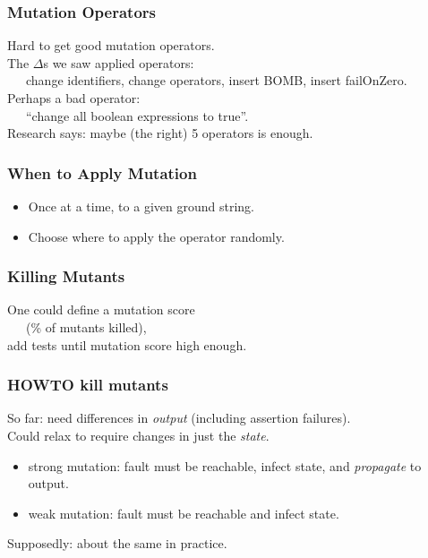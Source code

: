 \documentclass{beamer}
\newenvironment{changemargin}[1]{%
  \begin{list}{}{%
    \setlength{\topsep}{0pt}%
    \setlength{\leftmargin}{#1}%
    \setlength{\rightmargin}{1em}
    \setlength{\listparindent}{\parindent}%
    \setlength{\itemindent}{\parindent}%
    \setlength{\parsep}{\parskip}%
  }%
  \item[]}{\end{list}}
\begin{document}
\begin{frame}
  \frametitle{Mutation Operators}

  \large
  \begin{changemargin}{2em}
    Hard to get good mutation operators.\\[1em]
    The $\Delta$s we saw applied operators: \\
    ~~~change identifiers, change operators, insert BOMB, insert failOnZero.\\[1em]
    Perhaps a bad operator: \\
    ~~~``change all boolean expressions to {\sf true}''.\\[1em]
    Research says: maybe (the right) 5 operators is enough.
    
  \end{changemargin}
\end{frame}

\begin{frame}
  \frametitle{When to Apply Mutation}

  \large
  \begin{changemargin}{2em}
    \begin{itemize}
    \item Once at a time, to a given ground string.
    \item Choose where to apply the operator randomly.
    \end{itemize}
  \end{changemargin}
\end{frame}

\begin{frame}
  \frametitle{Killing Mutants}

  \Large
  \begin{changemargin}{2em}
    One could define a mutation score \\~~~(\% of mutants killed),\\
    add tests until mutation score high enough.
  \end{changemargin}
\end{frame}

\begin{frame}
  \frametitle{HOWTO kill mutants}

  \Large
  \begin{changemargin}{2em}
    So far: need differences in \emph{output} (including assertion failures).\\[1em]
    Could relax to require changes in just the \emph{state}.

    \begin{itemize}
    \item strong mutation: fault must be reachable, infect state, and \emph{propagate} to output.
      \item weak mutation: fault must be reachable and infect state.
    \end{itemize}

    Supposedly: about the same in practice.
  \end{changemargin}
\end{frame}
\end{document}
